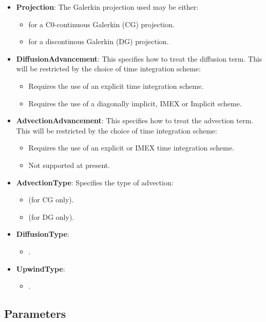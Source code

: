 \begin{itemize}
\item \textbf{Projection}: The Galerkin projection used may be either:
\begin{itemize}
	\item {} for a C0-continuous Galerkin (CG) projection.
	\item {} for a discontinous Galerkin (DG) projection.
\end{itemize}
\item \textbf{DiffusionAdvancement}: This specifies how to treat the diffusion term. This will be restricted by the choice of time integration scheme:
\begin{itemize}
	\item {} Requires the use of an explicit time integration
	scheme.
	\item {} Requires the use of a diagonally implicit, IMEX or
	Implicit scheme.
\end{itemize}
\item \textbf{AdvectionAdvancement}: This specifies how to treat the advection term. This will be restricted by the choice of time integration scheme:
\begin{itemize}
	\item {} Requires the use of an explicit or IMEX time integration
	scheme.
	\item {} Not supported at present.
\end{itemize}
\item \textbf{AdvectionType}: Specifies the type of advection:
\begin{itemize}
	\item {} (for CG only).
	\item {} (for DG only).
\end{itemize}
\item \textbf{DiffusionType}:
\begin{itemize}
	\item {}.
\end{itemize}
\item \textbf{UpwindType}:
\begin{itemize}
	\item {}.
\end{itemize}
\end{itemize}

\subsection{Parameters}

